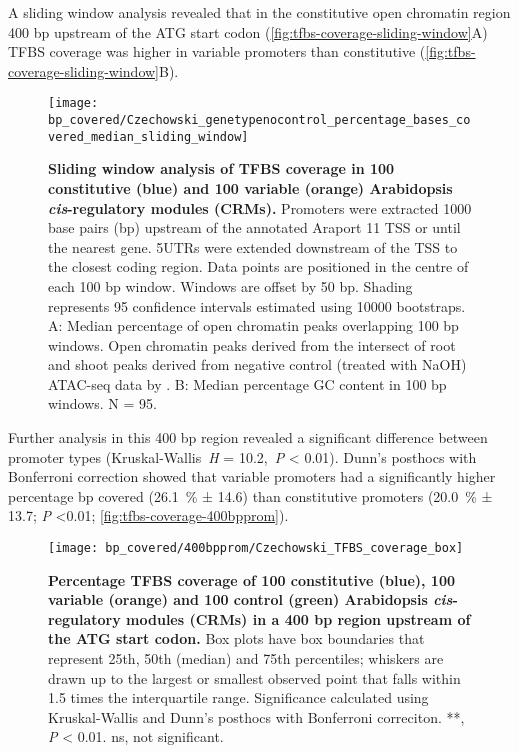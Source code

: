 \documentclass[../main.tex]{subfiles}
\begin{document}
A sliding window analysis revealed that in the constitutive open chromatin region 400 bp upstream of the ATG start codon (\autoref{fig:tfbs-coverage-sliding-window}A) TFBS coverage was higher in variable promoters than constitutive (\autoref{fig:tfbs-coverage-sliding-window}B).

 \begin{figure}[hbt!]
	\begin{center}
		\capstart
		\texttt{[image: bp\_covered/Czechowski\_genetypenocontrol\_percentage\_bases\_covered\_median\_sliding\_window]}
		\caption{
			\textbf{Sliding window analysis of TFBS coverage in 100 constitutive (blue) and 100 variable (orange) Arabidopsis \textit{cis}\hyp{}regulatory modules (CRMs).}
			Promoters were extracted 1000 base pairs (bp) upstream of the annotated Araport 11 \autocite{chengAraport11CompleteReannotation2017} TSS or until the nearest gene.
			5UTRs were extended downstream of the TSS to the closest coding region.
			Data points are positioned in the centre of each 100 bp window.
			Windows are offset by 50 bp.
			Shading represents 95 confidence intervals estimated using 10000 bootstraps.
			A: Median percentage of open chromatin peaks overlapping 100 bp windows. Open chromatin peaks derived from the intersect of root and shoot peaks derived from negative control (treated with NaOH) ATAC\hyp{}seq data by \textcite{potterCytokininModulatesContextdependent2018}.	
			B: Median percentage GC content in 100 bp windows. N = 95.
			\label{fig:tfbs-coverage-sliding-window}
		}
	\end{center}
\end{figure}


Further analysis in this 400 bp region revealed a significant difference between promoter types (Kruskal\hyp{}Wallis~\textit{H} = 10.2,~\textit{P} \textless{} 0.01). Dunn's posthocs with Bonferroni correction showed that variable promoters had a significantly higher percentage bp covered (\SI{26.1}{\percent} ± 14.6) than constitutive promoters (\SI{20.0}{\percent} ± 13.7; \textit{P} \textless 0.01; \autoref{fig:tfbs-coverage-400bpprom}).

\begin{figure}[hbt!]
	\begin{center}
		\capstart
		\texttt{[image: bp\_covered/400bpprom/Czechowski\_TFBS\_coverage\_box]}
		\caption{
			\textbf{Percentage TFBS coverage of 100 constitutive (blue), 100 variable (orange) and 100 control (green) Arabidopsis \textit{cis}\hyp{}regulatory modules (CRMs) in a 400 bp region upstream of the ATG start codon.}
			Box plots have box boundaries that represent 25th, 50th (median) and 75th percentiles; whiskers are drawn up to the largest or smallest observed point that falls within 1.5 times the interquartile range.
			Significance calculated using Kruskal\hyp{}Wallis and Dunn's posthocs with Bonferroni correciton.
			**, \textit{P} \textless{} 0.01. ns, not significant.
			\label{fig:tfbs-coverage-400bpprom}
		}
	\end{center}
\end{figure}
\end{document}
